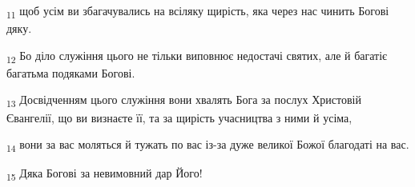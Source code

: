\begin{tcolorbox}
\textsubscript{11} щоб усім ви збагачувались на всіляку щирість, яка через нас чинить Богові дяку.
\end{tcolorbox}
\begin{tcolorbox}
\textsubscript{12} Бо діло служіння цього не тільки виповнює недостачі святих, але й багатіє багатьма подяками Богові.
\end{tcolorbox}
\begin{tcolorbox}
\textsubscript{13} Досвідченням цього служіння вони хвалять Бога за послух Христовій Євангелії, що ви визнаєте її, та за щирість учасництва з ними й усіма,
\end{tcolorbox}
\begin{tcolorbox}
\textsubscript{14} вони за вас моляться й тужать по вас із-за дуже великої Божої благодаті на вас.
\end{tcolorbox}
\begin{tcolorbox}
\textsubscript{15} Дяка Богові за невимовний дар Його!
\end{tcolorbox}
